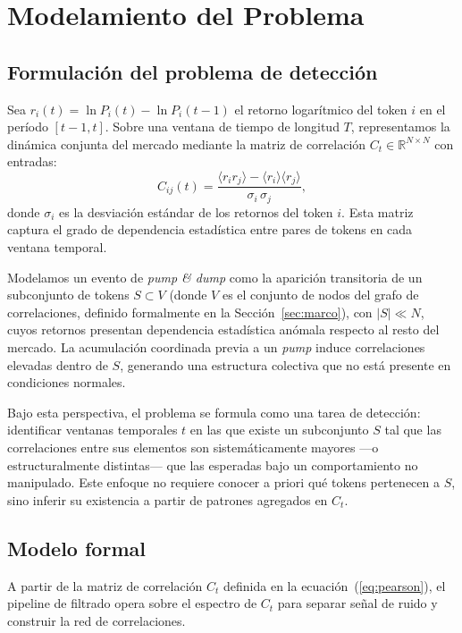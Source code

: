 \section{Modelamiento del Problema}

\subsection{Formulación del problema de detección}
\label{sec:formalizacion}

Sea $r_i(t) = \ln P_i(t) - \ln P_i(t-1)$ el retorno logarítmico del token $i$
en el período $[t-1, t]$. Sobre una ventana de tiempo de longitud $T$,
representamos la dinámica conjunta del mercado mediante la matriz de correlación
$C_t \in \mathbb{R}^{N \times N}$ con entradas:
\begin{equation}
  C_{ij}(t) = \frac{\langle r_i r_j \rangle - \langle r_i \rangle\langle r_j \rangle}
  {\sigma_i \,\sigma_j},
  \label{eq:pearson}
\end{equation}
donde $\sigma_i$ es la desviación estándar de los retornos del token $i$. Esta
matriz captura el grado de dependencia estadística entre pares de tokens en
cada ventana temporal.

Modelamos un evento de \emph{pump \& dump} como la aparición transitoria de un
subconjunto de tokens $S \subset V$ (donde $V$ es el conjunto de nodos del
grafo de correlaciones, definido formalmente en la Sección~\ref{sec:marco}),
con $|S| \ll N$, cuyos retornos presentan
dependencia estadística anómala respecto al resto del mercado. La acumulación
coordinada previa a un \emph{pump} induce correlaciones elevadas dentro de $S$,
generando una estructura colectiva que no está presente en condiciones normales.

Bajo esta perspectiva, el problema se formula como una tarea de detección:
identificar ventanas temporales $t$ en las que existe un subconjunto $S$ tal
que las correlaciones entre sus elementos son sistemáticamente mayores ---o
estructuralmente distintas--- que las esperadas bajo un comportamiento no
manipulado. Este enfoque no requiere conocer a priori qué tokens pertenecen a
$S$, sino inferir su existencia a partir de patrones agregados en $C_t$.

\subsection{Modelo formal}
\label{sec:modelo}

A partir de la matriz de correlación $C_t$ definida en la
ecuación~(\ref{eq:pearson}), el pipeline de filtrado opera sobre el espectro de
$C_t$ para separar señal de ruido y construir la red de correlaciones.

